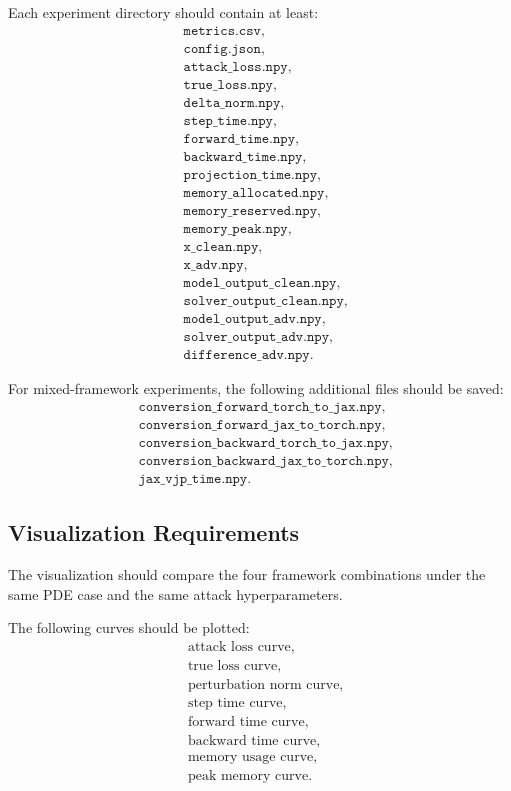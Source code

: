 \documentclass{article}
\begin{document}
Each experiment directory should contain at least:
\[
\begin{aligned}
&\texttt{metrics.csv},\\
&\texttt{config.json},\\
&\texttt{attack\_loss.npy},\\
&\texttt{true\_loss.npy},\\
&\texttt{delta\_norm.npy},\\
&\texttt{step\_time.npy},\\
&\texttt{forward\_time.npy},\\
&\texttt{backward\_time.npy},\\
&\texttt{projection\_time.npy},\\
&\texttt{memory\_allocated.npy},\\
&\texttt{memory\_reserved.npy},\\
&\texttt{memory\_peak.npy},\\
&\texttt{x\_clean.npy},\\
&\texttt{x\_adv.npy},\\
&\texttt{model\_output\_clean.npy},\\
&\texttt{solver\_output\_clean.npy},\\
&\texttt{model\_output\_adv.npy},\\
&\texttt{solver\_output\_adv.npy},\\
&\texttt{difference\_adv.npy}.
\end{aligned}
\]

For mixed-framework experiments, the following additional files should be saved:
\[
\begin{aligned}
&\texttt{conversion\_forward\_torch\_to\_jax.npy},\\
&\texttt{conversion\_forward\_jax\_to\_torch.npy},\\
&\texttt{conversion\_backward\_torch\_to\_jax.npy},\\
&\texttt{conversion\_backward\_jax\_to\_torch.npy},\\
&\texttt{jax\_vjp\_time.npy}.
\end{aligned}
\]

\subsection{Visualization Requirements}

The visualization should compare the four framework combinations under the same PDE case and the same attack hyperparameters.

The following curves should be plotted:
\[
\begin{aligned}
&\text{attack loss curve},\\
&\text{true loss curve},\\
&\text{perturbation norm curve},\\
&\text{step time curve},\\
&\text{forward time curve},\\
&\text{backward time curve},\\
&\text{memory usage curve},\\
&\text{peak memory curve}.
\end{aligned}
\]
\end{document}
